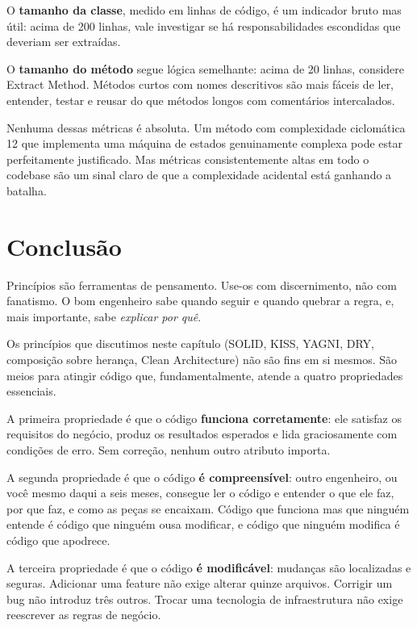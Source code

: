 O \textbf{tamanho da classe}, medido em linhas de código, é um indicador
bruto mas útil: acima de 200 linhas, vale investigar se há responsabilidades
escondidas que deveriam ser extraídas.

O \textbf{tamanho do método} segue lógica semelhante: acima de 20 linhas,
considere Extract Method. Métodos curtos com nomes descritivos são mais
fáceis de ler, entender, testar e reusar do que métodos longos com
comentários intercalados.

Nenhuma dessas métricas é absoluta. Um método com complexidade ciclomática
12 que implementa uma máquina de estados genuinamente complexa pode estar
perfeitamente justificado. Mas métricas consistentemente altas em todo o
codebase são um sinal claro de que a complexidade acidental está ganhando a
batalha.


\section{Conclusão}

Princípios são ferramentas de pensamento. Use-os com discernimento, não com
fanatismo. O bom engenheiro sabe quando seguir e quando quebrar a regra,
e, mais importante, sabe \emph{explicar por quê}.

Os princípios que discutimos neste capítulo (SOLID, KISS, YAGNI, DRY,
composição sobre herança, Clean Architecture) não são fins em si mesmos. São
meios para atingir código que, fundamentalmente, atende a quatro propriedades
essenciais.

A primeira propriedade é que o código \textbf{funciona corretamente}: ele
satisfaz os requisitos do negócio, produz os resultados esperados e lida
graciosamente com condições de erro. Sem correção, nenhum outro atributo
importa.

A segunda propriedade é que o código \textbf{é compreensível}: outro
engenheiro, ou você mesmo daqui a seis meses, consegue ler o código e
entender o que ele faz, por que faz, e como as peças se encaixam. Código
que funciona mas que ninguém entende é código que ninguém ousa modificar,
e código que ninguém modifica é código que apodrece.

A terceira propriedade é que o código \textbf{é modificável}: mudanças são
localizadas e seguras. Adicionar uma feature não exige alterar quinze
arquivos. Corrigir um bug não introduz três outros. Trocar uma tecnologia
de infraestrutura não exige reescrever as regras de negócio.

